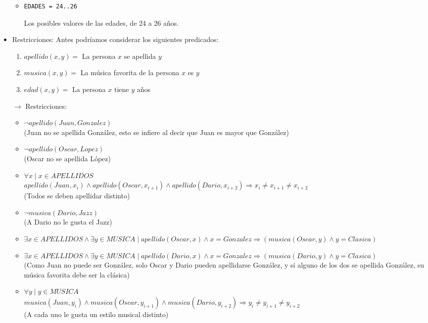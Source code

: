 \documentclass[12pt]{article}
\begin{document}
\begin{itemize}
\begin{itemize}
\item \begin{verbatim}
EDADES = 24..26
\end{verbatim}
Los posibles valores de las edades, de 24 a 26 años.
\end{itemize}
\item Restricciones:
Antes podríamos considerar los siguientes predicados:
\begin{enumerate}
\item $apellido(x,y) = $ La persona $x$ se apellida $y$
\item $musica(x,y) = $ La música favorita de la persona $x$ es $y$
\item $edad(x,y) = $ La persona $x$ tiene $y$ años
\end{enumerate}
$\rightarrow$ Restricciones:
\begin{itemize}
\item $\neg apellido(Juan, Gonzalez)$ \\ (Juan no se apellida González, esto se infiere al decir que Juan es mayor que González)
\item $\neg apellido(Oscar, Lopez)$ \\ (Oscar no se apellida López)
\item $\forall x \mid x \in APELLIDOS$ \\ $apellido(Juan,x_{i}) \land apellido(Oscar,x_{i+1}) \land apellido(Dario,x_{i+2}) \Rightarrow x_{i} \neq x_{i+1} \neq x_{i+2}$ \\ (Todos se deben apellidar distinto)
\item $\neg musica(Dario, Jazz)$ \\ (A Dario no le gusta el Jazz)
\item $\exists x \in APELLIDOS \land \exists y \in MUSICA \mid apellido(Oscar,x) \land x = Gonzalez \Rightarrow (musica(Oscar, y) \land y = Clasica)$
\item $\exists x \in APELLIDOS \land \exists y \in MUSICA \mid apellido(Dario,x) \land x = Gonzalez \Rightarrow (musica(Dario, y) \land y = Clasica)$ \\ (Como Juan no puede ser González, solo Oscar y Dario pueden apellidarse González, y si alguno de los dos se apellida González, su música favorita debe ser la clásica)
\item $\forall y \mid y \in MUSICA$ \\ $musica(Juan,y_{i}) \land musica(Oscar,y_{i+1}) \land musica(Dario,y_{i+2}) \Rightarrow y_{i} \neq y_{i+1} \neq y_{i+2}$ \\ (A cada uno le gusta un estilo musical distinto)

\end{itemize}
\end{itemize}
\end{document}
